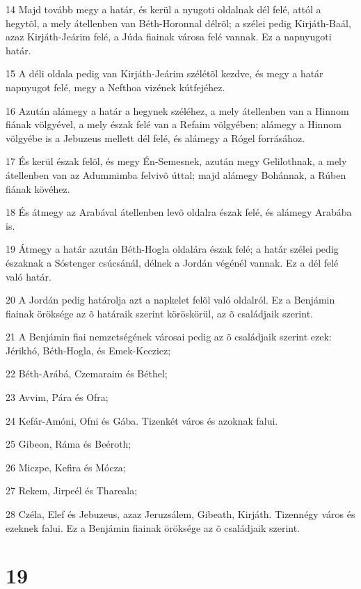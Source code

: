 \par 14 Majd tovább megy a határ, és kerül a nyugoti oldalnak dél felé, attól a hegytõl, a mely átellenben van Béth-Horonnal délrõl; a szélei pedig Kirjáth-Baál, azaz Kirjáth-Jeárim felé, a Júda fiainak városa felé vannak. Ez a napnyugoti határ.
\par 15 A déli oldala pedig van Kirjáth-Jeárim szélétõl kezdve, és megy a határ napnyugot felé, megy a Nefthoa vizének kútfejéhez.
\par 16 Azután alámegy a határ a hegynek széléhez, a mely átellenben van a Hinnom fiának völgyével, a mely észak felé van a Refaim völgyében; alámegy a Hinnom völgyébe is a Jebuzeus mellett dél felé, és alámegy a Rógel  forrásához.
\par 17 És kerül észak felõl, és megy Én-Semesnek, azután megy Gelilothnak, a mely átellenben van az Adummimba felvivõ úttal; majd alámegy Bohánnak, a Rúben fiának kövéhez.
\par 18 És átmegy az Arabával átellenben levõ oldalra észak felé, és alámegy Arabába is.
\par 19 Átmegy a határ azután Béth-Hogla oldalára észak felé; a határ szélei pedig északnak a Sóstenger csúcsánál, délnek a Jordán végénél vannak. Ez a dél felé való határ.
\par 20 A Jordán pedig határolja azt a napkelet felõl való oldalról. Ez a Benjámin fiainak öröksége az õ határaik szerint köröskörül, az õ családjaik szerint.
\par 21 A Benjámin fiai nemzetségének városai pedig az õ családjaik szerint ezek: Jérikhó, Béth-Hogla, és Emek-Keczicz;
\par 22 Béth-Arábá, Czemaraim és Béthel;
\par 23 Avvim, Pára és Ofra;
\par 24 Kefár-Amóni, Ofni és Gába. Tizenkét város és azoknak falui.
\par 25 Gibeon, Ráma és Beéroth;
\par 26 Miczpe, Kefira és Mócza;
\par 27 Rekem, Jirpeél és Thareala;
\par 28 Czéla, Elef és Jebuzeus, azaz Jeruzsálem, Gibeath, Kirjáth. Tizennégy város és ezeknek falui. Ez a Benjámin fiainak öröksége az õ családjaik szerint.

\chapter{19}

